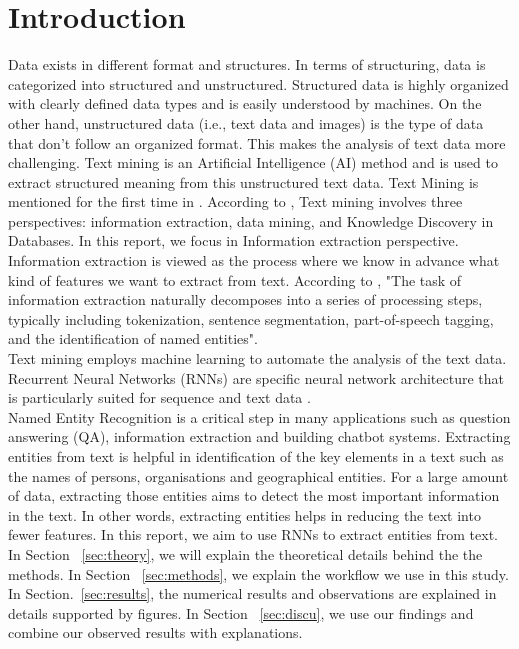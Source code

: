\documentclass[sigconf, nonacm, natbib, screen, balance=False]{acmart}
\begin{document}
\section{Introduction}\label{sec:intro}
Data exists in different format and structures. In terms of structuring, data is categorized into structured and unstructured. Structured data is highly organized with clearly defined data types and is easily understood by machines. On the other hand, unstructured data (i.e., text data and images) is the type of data that don't follow an organized format. This makes the analysis of text data more challenging. Text mining is an Artificial Intelligence (AI) method and is used to extract structured meaning from this unstructured text data. Text Mining is mentioned for the first time in \citet{Feldman1998TextMA}. According to \citet{Hotho2005ABS}, Text mining involves three perspectives: information extraction, data mining, and Knowledge Discovery in Databases. In this report, we focus in Information extraction perspective. Information extraction is viewed as the process where we know in advance what kind of features we want to extract from text. According to \citet{Hotho2005ABS}, "The task of information extraction naturally decomposes into a series of processing steps, typically including tokenization, sentence segmentation, part-of-speech tagging, and the identification of named entities".
\hfill\\
Text mining employs machine learning to automate the analysis of the text data. Recurrent Neural Networks (RNNs) are specific neural network architecture that is particularly suited for sequence and text data \citep{Rumelhart:1986we}. 
\hfill\\
Named Entity Recognition is a critical step in many applications such as question answering (QA), information extraction and building chatbot systems. Extracting entities from text is helpful in identification of the key elements in a text such as the names of persons, organisations and geographical entities. For a large amount of data, extracting those entities aims to detect the most important information in the text. In other words, extracting entities helps in reducing the text into fewer features. In this report, we aim to use RNNs to extract entities from text. In Section ~\ref{sec:theory}, we will explain the theoretical details behind the the methods. In Section ~\ref{sec:methods}, we explain the workflow we use in this study. In Section.~\ref{sec:results}, the numerical results and observations are explained in details supported by figures. In Section ~\ref{sec:discu}, we use our findings and combine our observed results with explanations. 
\end{document}
